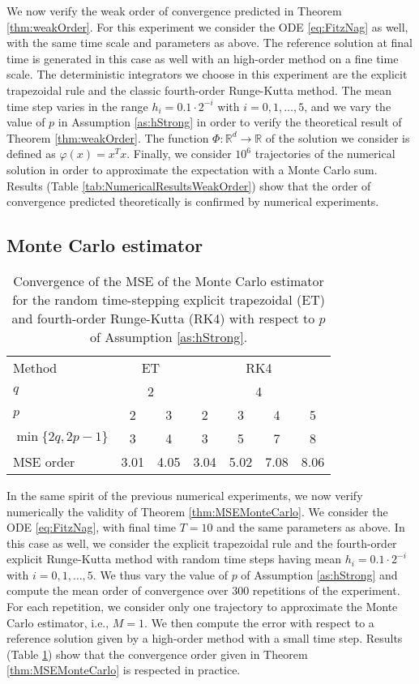 \documentclass{siamart1116}
\numberwithin{theorem}{section}
\renewcommand{\phi}{\varphi}
\newcommand{\R}{\mathbb{R}}
\begin{document}
We now verify the weak order of convergence predicted in Theorem \ref{thm:weakOrder}. For this experiment we consider the ODE \eqref{eq:FitzNag} as well, with the same time scale and parameters as above. The reference solution at final time is generated in this case as well with an high-order method on a fine time scale. The deterministic integrators we choose in this experiment are the explicit trapezoidal rule and the classic fourth-order Runge-Kutta method. The mean time step varies in the range $h_i = 0.1\cdot 2^{-i}$ with $i = 0, 1, \ldots, 5$, and we vary the value of $p$ in Assumption \ref{as:hStrong} in order to verify the theoretical result of Theorem \ref{thm:weakOrder}. The function $\Phi\colon\R^d\to\R$ of the solution we consider is defined as $\phi(x) = x^Tx$. Finally, we consider $10^6$ trajectories of the numerical solution in order to approximate the expectation with a Monte Carlo sum. Results (Table \ref{tab:NumericalResultsWeakOrder}) show that the order of convergence predicted theoretically is confirmed by numerical experiments. 

\subsection{Monte Carlo estimator}

\begin{table}[t!]
	\centering
	\begin{tabular}{lcccccc}
		\toprule
		Method & \multicolumn{2}{c}{ET} & \multicolumn{4}{c}{RK4} \\ 
		\cmidrule(l{2pt}r{2pt}){2-3} \cmidrule(l{2pt}r{2pt}){4-7} 
		$q$ & \multicolumn{2}{c}{2} & \multicolumn{4}{c}{4} \\
		$p$ & 2 & 3 & 2 & 3 & 4 & 5\\
		$\min\{2q, 2p - 1\}$ & 3 & 4 & 3 & 5 & 7 & 8\\
		MSE order & 3.01 & 4.05 & 3.04 & 5.02 & 7.08 & 8.06\\
		\bottomrule
	\end{tabular}
	\caption{Convergence of the MSE of the Monte Carlo estimator for the random time-stepping explicit trapezoidal (ET) and fourth-order Runge-Kutta (RK4) with respect to $p$ of Assumption \ref{as:hStrong}.}
	\label{tab:NumericalResultsMSE}
\end{table}

In the same spirit of the previous numerical experiments, we now verify numerically the validity of Theorem \ref{thm:MSEMonteCarlo}. We consider the ODE \eqref{eq:FitzNag}, with final time $T = 10$ and the same parameters as above. In this case as well, we consider the explicit trapezoidal rule and the fourth-order explicit Runge-Kutta method with random time steps having mean $h_i = 0.1\cdot 2^{-i}$ with $i = 0, 1, \ldots, 5$. We thus vary the value of $p$ of Assumption \ref{as:hStrong} and compute the mean order of convergence over 300 repetitions of the experiment. For each repetition, we consider only one trajectory to approximate the Monte Carlo estimator, i.e., $M = 1$. We then compute the error with respect to a reference solution given by a high-order method with a small time step. Results (Table \ref{tab:NumericalResultsMSE}) show that the convergence order given in Theorem \ref{thm:MSEMonteCarlo} is respected in practice.
\end{document}
